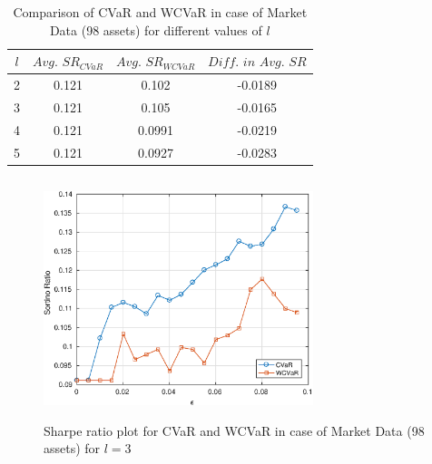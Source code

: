 \documentclass[12pt]{article}
\numberwithin{equation}{section}
\begin{document}
\begin{table}[!h]
    \centering
    \captionsetup{justification=centering}

   \begin{tabular}{||c|c|c|c||}
   \hline
  
$l$ & $Avg. \, \, SR_{CVaR}$ & $Avg. \, \, SR_{WCVaR}$ & $Diff. \, \, in \, \, Avg. \, \, SR$ \\
  
  \hline
2 & 0.121 & 0.102 & -0.0189 \\
3 & 0.121 & 0.105 & -0.0165 \\
4 & 0.121 & 0.0991 & -0.0219 \\
5 & 0.121 & 0.0927 & -0.0283 \\
  \hline
\end{tabular}
    \caption{Comparison of CVaR and WCVaR in case of Market Data (98 assets) for different values of $l$}
    \label{avgtab:6.4}
\end{table}

\begin{figure}[!h]
    \centering
   
    \includegraphics[height=7.0cm,width=0.7\textwidth]{CVaR/bse100_market/sr_cvar_3.eps}

   \caption{Sharpe ratio plot for CVaR and WCVaR in case of Market Data (98 assets) for $l=3$}
   \label{fig:6.4}
\end{figure}
\end{document}
